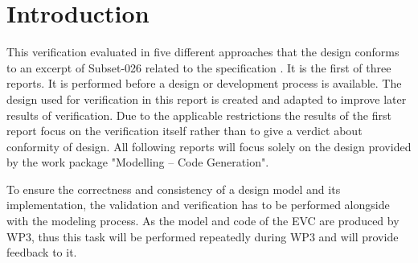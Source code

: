 \documentclass{template/openetcs_report}
\newcommand{\mychapter}[2]{
    \setcounter{chapter}{#1}
    \setcounter{section}{0}
    \chapter*{#2}
}
\begin{document}
\maketitle \tableofcontents \listoffiguresandtables \newpage




\mychapter{0}{Introduction}
This verification evaluated in five different approaches that the design conforms to an excerpt of Subset-026 \cite{unisig_subset-026_2012}  related to the specification \cite{tsi-2012-88-eu} \cite{tsi-2012-696-eu}.  It is the first of three reports. It is performed before a design or development process is available. The design used for verification in this report is created and adapted to improve later results of verification. Due to the applicable restrictions the results of the first report focus on the verification itself rather than to give a verdict about conformity of design. All following reports will focus solely on the design provided by the work package "Modelling – Code Generation".

To ensure the correctness and consistency of a design model and its implementation, the
validation and verification has to be performed alongside with the modeling process. 
As the model and code of the EVC are produced by WP3,
thus this task will be performed repeatedly during WP3 and will provide
feedback to it.


\newpage



\newpage


\let\oldparagraph\paragraph
\let\oldsubparagraph\subparagraph

\renewcommand{\paragraph}[1]{\subsection{#1}}
\renewcommand{\subparagraph}[1]{\subsubsection{#1}}
\end{document}
